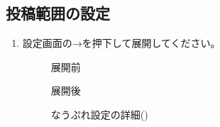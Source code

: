\subsection{投稿範囲の設定}
\begin{enumerate}
    \item 設定画面の→を押下して展開してください。
        \begin{figure}[htbp]
            \begin{minipage}[b]{0.45\linewidth}
                \centering
                \caption{展開前}
                \label{img:guide1}
            \end{minipage}
            \begin{minipage}[b]{0.45\linewidth}
                \centering
                \caption{展開後}
                \label{img:guide2}
            \end{minipage}
            \caption*{\mi なうぷれ設定の詳細(\currentVersion)}
        \end{figure}


\end{enumerate}
